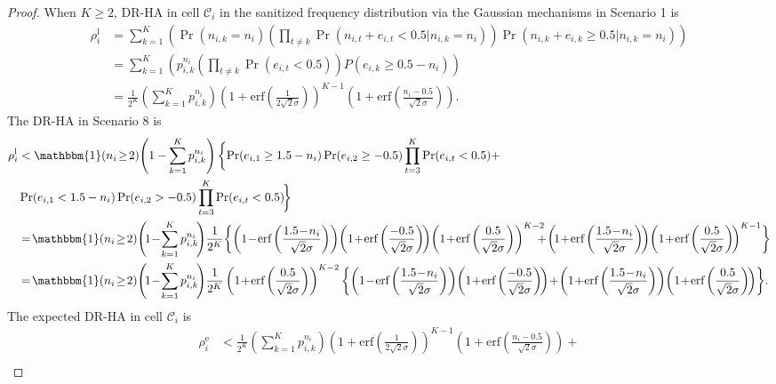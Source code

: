 \documentclass[10pt,journal,compsoc]{IEEEtran}
\newcommand{\C}{\mathcal{C}}
\begin{document}
\begin{proof}
When $K\ge2$, DR-HA in cell $\C_i$ in the sanitized frequency distribution via the Gaussian mechanisms in Scenario 1 is 
\begin{align*}
\rho^{\text{l}}_i&=\sum_{k=1}^{K}\left(\Pr(n_{i,k}\!=\!n_i)\left(\prod_{t\neq k}\Pr(n_{i,t}\!+\!e_{i,t}\!<\!0.5|n_{i,k}\!=\!n_i)\right)\Pr(n_{i,k}\!+\!e_{i,k}\!\geqslant\!0.5|n_{i,k}\!=\!n_i)\!\right)\\
&=\sum_{k=1}^{K}\left(p_{i,k}^{n_i}\left(\prod_{t\neq k}\Pr(e_{i,t}<0.5)\right)P(e_{i,k}\geqslant0.5-n_i)\right)\\
&=\frac{1}{2^K}\left(\sum_{k=1}^{K}p_{i,k}^{n_i}\right)\left(1+\mbox{erf}\left(\frac{1}{2\sqrt{2}\sigma}\right)\right)^{K-1}\left(1+\mbox{erf}\left(\frac{n_i-0.5}{\sqrt{2}\sigma}\right)\right).
\end{align*}
The DR-HA in Scenario 8 is
\small 
\begin{align*}
\rho^{\text{l}}_i&<\mathbbm{1}(n_i\!\ge\!2)\!\left(1-\sum_{k=1}^K p_{i,k}^{n_i}\right)\bigg\{\!\Pr(e_{i,1}\geq 1.5-n_i)\Pr(e_{i,2}\geq-0.5)\prod_{t=3}^K\Pr(e_{i,t}<0.5)+\\
&\Pr(e_{i,1}< 1.5-n_i)\Pr(e_{i,2}>-0.5)\prod_{t=3}^K\Pr(e_{i,t}<0.5)\!\bigg\}\\
&=\!\mathbbm{1}(n_i\!\ge\!2)\!\left(\!1\!-\!\sum_{k=1}^K p_{i,k}^{n_i}\!\right)\!\frac{1}{2^K}\bigg\{\!\left(1\!-\!\mbox{erf}\left(\frac{1.5\!-\!n_i}{\sqrt{2}\sigma}\right)\right)\!\left(1\!+\!\mbox{erf}\left(\frac{-0.5}{\sqrt{2}\sigma}\right)\!\right)\!\left(1\!+\!\mbox{erf}\left(\frac{0.5}{\sqrt{2}\sigma}\right)\right)^{K-2}\!\!\!\!\!+\!\left(\!1\!+\!\mbox{erf}\left(\frac{1.5\!-\!n_i}{\sqrt{2}\sigma}\right)\!\right)\!\left(1\!+\!\mbox{erf}\left(\frac{0.5}{\sqrt{2}\sigma}\right)\!\right)^{K-1}\!\bigg\}\\
&=\!\mathbbm{1}(n_i\!\ge\!2)\!\left(\!1\!-\!\sum_{k=1}^K p_{i,k}^{n_i}\!\right)\!\frac{1}{2^K}\left(1\!+\!\mbox{erf}\left(\frac{0.5}{\sqrt{2}\sigma}\right)\right)^{K-2}\bigg\{\!\left(1\!-\!\mbox{erf}\left(\frac{1.5\!-\!n_i}{\sqrt{2}\sigma}\right)\right)\!\left(1\!+\!\mbox{erf}\left(\frac{-0.5}{\sqrt{2}\sigma}\right)\!\right)\!+\!\left(1\!+\!\mbox{erf}\left(\frac{1.5\!-\!n_i}{\sqrt{2}\sigma}\right)\right)\!\left(1\!+\!\mbox{erf}\left(\frac{0.5}{\sqrt{2}\sigma}\right)\!\right)\!\bigg\}.
\end{align*}
The expected DR-HA in cell $\C_i$ is
\begin{align*}
\rho^{\text{e}}_i&<\frac{1}{2^K}\left(\sum_{k=1}^{K}p_{i,k}^{n_i}\right)\left(1+\mbox{erf}\left(\frac{1}{2\sqrt{2}\sigma}\right)\right)^{K-1}\left(1+\mbox{erf}\left(\frac{n_i-0.5}{\sqrt{2}\sigma}\right)\right)+\\

\end{align*}
\end{proof}
\end{document}
